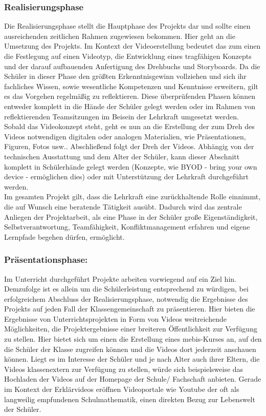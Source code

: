 \documentclass[a4paper,12pt,twoside=false]{scrartcl}
\begin{document}
\subsubsection{Realisierungsphase}
	Die Realisierungsphase stellt die Hauptphase des Projekts dar und sollte einen ausreichenden zeitlichen Rahmen zugewiesen bekommen. Hier geht an die Umsetzung des Projekts. Im Kontext der Videoerstellung bedeutet das zum einen die Festlegung auf einen Videotyp, die Entwicklung eines tragfähigen Konzepts und der darauf aufbauenden Anfertigung des Drehbuchs und Storyboards. Da die Schüler in dieser Phase den größten Erkenntnisgewinn vollziehen und sich ihr fachliches Wissen, sowie wesentliche Kompetenzen und Kenntnisse erweitern, gilt es das Vorgehen regelmäßig zu reflektieren. Diese überprüfenden Phasen können entweder komplett in die Hände der Schüler gelegt werden oder im Rahmen von reflektierenden Teamsitzungen im Beisein der Lehrkraft umgesetzt werden. \\
	Sobald das Videokonzept steht, geht es nun an die Erstellung der zum Dreh des Videos notwendigen digitalen oder analogen Materialien, wie Präsentationen, Figuren, Fotos usw..
	Abschließend folgt der Dreh der Videos. Abhängig von der technischen Ausstattung und dem Alter der Schüler, kann dieser Abschnitt komplett in Schülerhände gelegt werden (Konzepte, wie BYOD - bring your own device - ermöglichen dies) oder mit Unterstützung der Lehrkraft durchgeführt werden. \\
	Im gesamten Projekt gilt, dass die Lehrkraft eine zurückhaltende Rolle einnimmt, die auf Wunsch eine beratende Tätigkeit ausübt. Dadurch wird das zentrale Anliegen der Projektarbeit, als eine Phase in der Schüler große Eigenständigkeit, Selbstverantwortung, Teamfähigkeit, Konfliktmanagement erfahren und eigene Lernpfade begehen dürfen, ermöglicht. 
\subsubsection{Präsentationsphase:} Im Unterricht durchgeführt Projekte arbeiten vorwiegend auf ein Ziel hin. Demzufolge ist es allein um die Schülerleistung entsprechend zu würdigen, bei erfolgreichem Abschluss der Realisierungsphase, notwendig die Ergebnisse des Projekts auf jeden Fall der Klassengemeinschaft zu präsentieren. Hier bieten die Ergebnisse von Unterrichtsprojekten in Form von Videos weitreichende Möglichkeiten, die Projektergebnisse einer breiteren Öffentlichkeit zur Verfügung zu stellen. Hier bietet sich um einen die Erstellung eines mebis-Kurses an, auf den die Schüler der Klasse zugreifen können und die Videos dort jederzeit anschauen können. Liegt es im Interesse der Schüler und je nach Alter auch ihrer Eltern, die Videos klassenextern zur Verfügung zu stellen, würde sich beispielsweise das Hochladen der Videos auf der Homepage der Schule/ Fachschaft anbieten. Gerade im Kontext der Erklärvideos eröffnen Videoportale wie Youtube der oft als langweilig empfundenen Schulmathematik, einen direkten Bezug zur Lebenswelt der Schüler.
\end{document}
